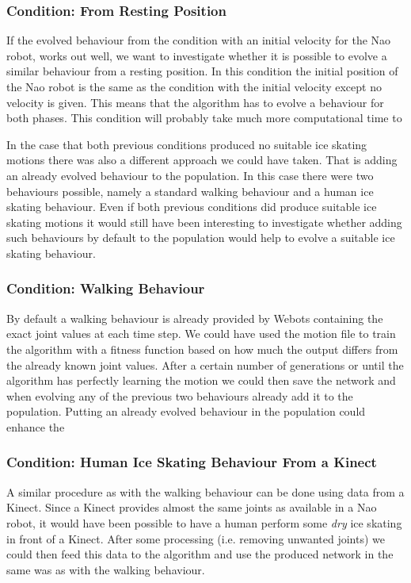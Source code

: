 \documentclass[a4paper,10pt]{article}
\begin{document}
\subsubsection{Condition: From Resting Position}
If the evolved behaviour from the condition with an initial velocity for the Nao robot, works out well, we want to investigate whether it is possible to evolve a similar behaviour from a resting position. In this condition the initial position of the Nao robot is the same as the condition with the initial velocity except no velocity is given. This means that the algorithm has to evolve a behaviour for both phases. This condition will probably take much more computational time to 

In the case that both previous conditions produced no suitable ice skating motions there was also a different approach we could have taken. That is adding an already evolved behaviour to the population. In this case there were two behaviours possible, namely a standard walking behaviour and a human ice skating behaviour. Even if both previous conditions did produce suitable ice skating motions it would still have been interesting to investigate whether adding such behaviours by default to the population would help to evolve a suitable ice skating behaviour.

\subsubsection{Condition: Walking Behaviour}
By default a walking behaviour is already provided by Webots containing the exact joint values at each time step. We could have used the motion file to train the algorithm with a fitness function based on how much the output differs from the already known joint values. After a certain number of generations or until the algorithm has perfectly learning the motion we could then save the network and when evolving any of the previous two behaviours already add it to the population. Putting an already evolved behaviour in the population could enhance the  

\subsubsection{Condition: Human Ice Skating Behaviour From a Kinect}
A similar procedure as with the walking behaviour can be done using data from a Kinect. Since a Kinect provides almost the same joints as available in a Nao robot, it would have been possible to have a human perform some \emph{dry} ice skating in front of a Kinect. After some processing (i.e. removing unwanted joints) we could then feed this data to the algorithm and use the produced network in the same was as with the walking behaviour.
\end{document}
